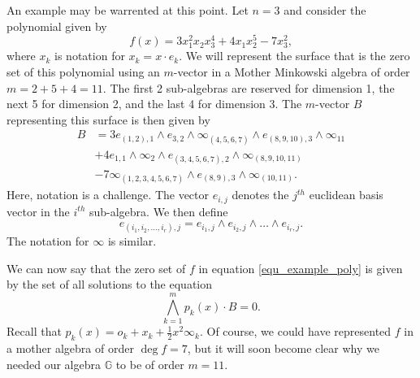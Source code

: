 \documentclass{birkjour}
\theoremstyle{definition}
\theoremstyle{remark}
\numberwithin{equation}{section}
\newcommand{\G}{\mathbb{G}}
\newcommand{\nvai}{\infty}
\newcommand{\nvao}{o}
\begin{document}
An example may be warrented at this point.  Let $n=3$ and consider the
polynomial given by
\begin{equation}\label{equ_example_poly}
f(x) = 3x_1^2x_2x_3^4 + 4x_1x_2^5 - 7x_3^2,
\end{equation}
where $x_k$ is notation for $x_k=x\cdot e_k$.  We will represent the
surface that is the zero set of this polynomial using an $m$-vector
in a Mother Minkowski algebra of order $m=2+5+4=11$.  The first
2 sub-algebras are reserved for dimension 1, the next 5 for dimension
2, and the last 4 for dimension 3.  The $m$-vector $B$
representing this surface is then given by
\begin{align*}
B &= 3e_{(1,2),1}\wedge e_{3,2}\wedge \nvai_{(4,5,6,7)} \wedge e_{(8,9,10),3} \wedge \nvai_{11} \\
 &+ 4e_{1,1}\wedge\nvai_2\wedge e_{(3,4,5,6,7),2}\wedge\nvai_{(8,9,10,11)} \\
 &- 7\nvai_{(1,2,3,4,5,6,7)}\wedge e_{(8,9),3}\wedge\nvai_{(10,11)}.
\end{align*}
Here, notation is a challenge.  The vector $e_{i,j}$ denotes the $j^{th}$ euclidean basis vector
in the $i^{th}$ sub-algebra.  We then define
\begin{equation*}
e_{(i_1,i_2,\dots,i_r),j} = e_{i_1,j}\wedge e_{i_2,j}\wedge\dots\wedge e_{i_r,j}.
\end{equation*}
The notation for $\nvai$ is similar.

We can now say that the zero set of $f$ in equation \eqref{equ_example_poly}
is given by the set of all solutions to the equation
\begin{equation}\label{equ_surface_rep}
\bigwedge_{k=1}^m p_k(x)\cdot B = 0.
\end{equation}
Recall that $p_k(x)=\nvao_k+x_k+\frac{1}{2}x^2\nvai_k$.
Of course, we could have represented $f$ in a mother algebra of order $\deg f=7$,
but it will soon become clear why we needed our algebra $\G$ to be of order $m=11$.
\end{document}
